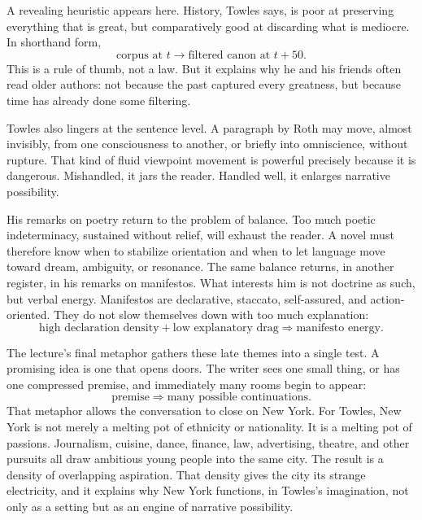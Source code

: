 A revealing heuristic appears here. History, Towles says, is poor at preserving everything that is great, but comparatively good at discarding what is mediocre. In shorthand form,
\begin{equation}
\text{corpus at } t \longrightarrow \text{filtered canon at } t+50.
\end{equation}
This is a rule of thumb, not a law. But it explains why he and his friends often read older authors: not because the past captured every greatness, but because time has already done some filtering.

Towles also lingers at the sentence level. A paragraph by Roth may move, almost invisibly, from one consciousness to another, or briefly into omniscience, without rupture. That kind of fluid viewpoint movement is powerful precisely because it is dangerous. Mishandled, it jars the reader. Handled well, it enlarges narrative possibility.

His remarks on poetry return to the problem of balance. Too much poetic indeterminacy, sustained without relief, will exhaust the reader. A novel must therefore know when to stabilize orientation and when to let language move toward dream, ambiguity, or resonance. The same balance returns, in another register, in his remarks on manifestos. What interests him is not doctrine as such, but verbal energy. Manifestos are declarative, staccato, self-assured, and action-oriented. They do not slow themselves down with too much explanation:
\begin{equation}
\text{high declaration density} + \text{low explanatory drag} \Rightarrow \text{manifesto energy}.
\end{equation}

The lecture's final metaphor gathers these late themes into a single test. A promising idea is one that opens doors. The writer sees one small thing, or has one compressed premise, and immediately many rooms begin to appear:
\begin{equation}
\text{premise} \Rightarrow \text{many possible continuations}.
\end{equation}
That metaphor allows the conversation to close on New York. For Towles, New York is not merely a melting pot of ethnicity or nationality. It is a melting pot of passions. Journalism, cuisine, dance, finance, law, advertising, theatre, and other pursuits all draw ambitious young people into the same city. The result is a density of overlapping aspiration. That density gives the city its strange electricity, and it explains why New York functions, in Towles's imagination, not only as a setting but as an engine of narrative possibility.

